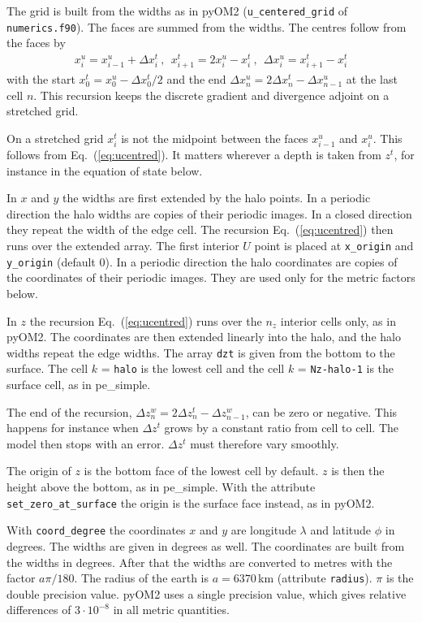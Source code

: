 \documentclass[12pt]{article}
\newcommand{\beq}  { \begin{eqnarray} }
\newcommand{\eeq}  { \end{eqnarray}}
\newcommand{\eq }  [1]{Eq.~(\ref{#1})}  %
\begin{document}
The grid is built from the widths as in pyOM2 (\verb|u_centered_grid| of \verb|numerics.f90|).
The faces are summed from the widths.
The centres follow from the faces by
\beq \label{eq:ucentred}
 x^u_i = x^u_{i-1} + \Delta x^t_i ~,~~
 x^t_{i+1} = 2 x^u_i - x^t_i ~,~~
 \Delta x^u_i = x^t_{i+1} - x^t_i
\eeq
with the start $x^t_0 = x^u_0 - \Delta x^t_0/2$ and the end $\Delta x^u_n = 2 \Delta x^t_n - \Delta x^u_{n-1}$ at the last cell $n$.
This recursion keeps the discrete gradient and divergence adjoint on a stretched grid.

On a stretched grid $x^t_i$ is not the midpoint between the faces $x^u_{i-1}$ and $x^u_i$.
This follows from \eq{eq:ucentred}.
It matters wherever a depth is taken from $z^t$, for instance in the equation of state below.

In $x$ and $y$ the widths are first extended by the halo points.
In a periodic direction the halo widths are copies of their periodic images.
In a closed direction they repeat the width of the edge cell.
The recursion \eq{eq:ucentred} then runs over the extended array.
The first interior $U$ point is placed at \verb|x_origin| and \verb|y_origin| (default 0).
In a periodic direction the halo coordinates are copies of the coordinates of their periodic images.
They are used only for the metric factors below.

In $z$ the recursion \eq{eq:ucentred} runs over the $n_z$ interior cells only, as in pyOM2.
The coordinates are then extended linearly into the halo, and the halo widths repeat the edge widths.
The array \verb|dzt| is given from the bottom to the surface.
The cell $k$ = \verb|halo| is the lowest cell and the cell $k$ = \verb|Nz-halo-1| is the surface cell, as in pe\_simple.

The end of the recursion, $\Delta z^w_n = 2 \Delta z^t_n - \Delta z^w_{n-1}$, can be zero or negative.
This happens for instance when $\Delta z^t$ grows by a constant ratio from cell to cell.
The model then stops with an error.
$\Delta z^t$ must therefore vary smoothly.

The origin of $z$ is the bottom face of the lowest cell by default.
$z$ is then the height above the bottom, as in pe\_simple.
With the attribute \verb|set_zero_at_surface| the origin is the surface face instead, as in pyOM2.

With \verb|coord_degree| the coordinates $x$ and $y$ are longitude $\lambda$ and latitude $\phi$ in degrees.
The widths are given in degrees as well.
The coordinates are built from the widths in degrees.
After that the widths are converted to metres with the factor $a \pi / 180$.
The radius of the earth is $a = 6370\,$km (attribute \verb|radius|).
$\pi$ is the double precision value.
pyOM2 uses a single precision value, which gives relative differences of $3 \cdot 10^{-8}$ in all metric quantities.
\end{document}
